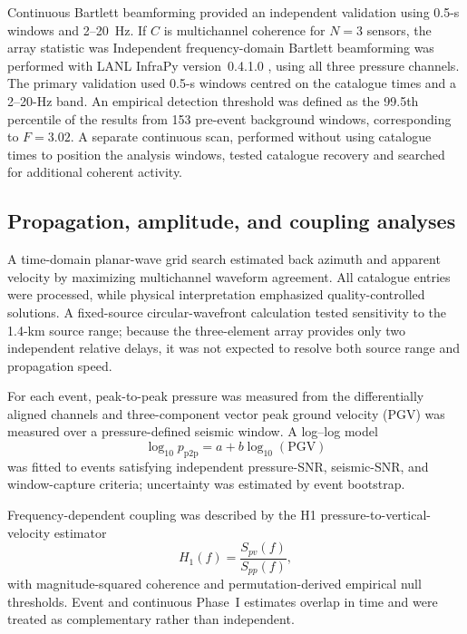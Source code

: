 \documentclass[]{seismica}
\begin{document}
Continuous Bartlett beamforming provided an independent validation using
0.5-s windows and 2--20~Hz. If $C$ is multichannel coherence for $N=3$
sensors, the array statistic was
Independent frequency-domain Bartlett beamforming was performed with LANL
InfraPy version~0.4.1.0 \citep{webster_infrapy_2025}, using all three pressure
channels. The primary validation used 0.5-s windows centred on the catalogue
times and a 2--20-Hz band. An empirical detection threshold was defined as the
99.5th percentile of the results from 153 pre-event background windows,
corresponding to $F=3.02$. A separate continuous scan, performed without using
catalogue times to position the analysis windows, tested catalogue recovery
and searched for additional coherent activity.

\subsection{Propagation, amplitude, and coupling analyses}

A time-domain planar-wave grid search estimated back azimuth and apparent
velocity by maximizing multichannel waveform agreement. All catalogue entries
were processed, while physical interpretation emphasized quality-controlled
solutions. A fixed-source circular-wavefront calculation tested sensitivity to
the 1.4-km source range; because the three-element array provides only two
independent relative delays, it was not expected to resolve both source range
and propagation speed.

For each event, peak-to-peak pressure was measured from the differentially
aligned channels and three-component vector peak ground velocity (PGV) was
measured over a pressure-defined seismic window. A log--log model
\begin{equation}
 \log_{10}p_{\mathrm{p2p}}=a+b\log_{10}(\mathrm{PGV})
 \label{eq:power_law}
\end{equation}
was fitted to events satisfying independent pressure-SNR, seismic-SNR, and
window-capture criteria; uncertainty was estimated by event bootstrap.

Frequency-dependent coupling was described by the H1 pressure-to-vertical-
velocity estimator
\begin{equation}
 H_1(f)=\frac{S_{pv}(f)}{S_{pp}(f)},
 \label{eq:h1_transfer}
\end{equation}
with magnitude-squared coherence and permutation-derived empirical null
thresholds. Event and continuous Phase~I estimates overlap in time and were
treated as complementary rather than independent.
\end{document}
